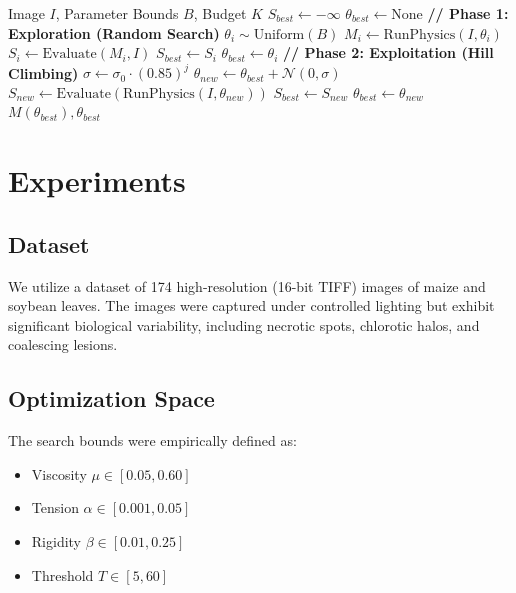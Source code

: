 \documentclass[journal]{IEEEtran}
\begin{document}
\begin{algorithm}
\caption{Stochastic Parameter Optimization}
\begin{algorithmic}[1]
\REQUIRE Image $I$, Parameter Bounds $B$, Budget $K$
\STATE $S_{best} \leftarrow -\infty$
\STATE $\theta_{best} \leftarrow \text{None}$
\STATE \textbf{// Phase 1: Exploration (Random Search)}
    \STATE $\theta_i \sim \text{Uniform}(B)$
    \STATE $M_i \leftarrow \text{RunPhysics}(I, \theta_i)$
    \STATE $S_i \leftarrow \text{Evaluate}(M_i, I)$
        \STATE $S_{best} \leftarrow S_i$
        \STATE $\theta_{best} \leftarrow \theta_i$
    \ENDIF
\ENDFOR
\STATE \textbf{// Phase 2: Exploitation (Hill Climbing)}
    \STATE $\sigma \leftarrow \sigma_0 \cdot (0.85)^j$ 
    \STATE $\theta_{new} \leftarrow \theta_{best} + \mathcal{N}(0, \sigma)$
    \STATE $S_{new} \leftarrow \text{Evaluate}(\text{RunPhysics}(I, \theta_{new}))$
        \STATE $S_{best} \leftarrow S_{new}$
        \STATE $\theta_{best} \leftarrow \theta_{new}$
    \ENDIF
\ENDFOR
\RETURN $M(\theta_{best}), \theta_{best}$
\end{algorithmic}
\end{algorithm}

\section{Experiments}
\subsection{Dataset}
We utilize a dataset of 174 high-resolution (16-bit TIFF) images of maize and soybean leaves. The images were captured under controlled lighting but exhibit significant biological variability, including necrotic spots, chlorotic halos, and coalescing lesions.

\subsection{Optimization Space}
The search bounds were empirically defined as:
\begin{itemize}
    \item Viscosity $\mu \in [0.05, 0.60]$
    \item Tension $\alpha \in [0.001, 0.05]$
    \item Rigidity $\beta \in [0.01, 0.25]$
    \item Threshold $T \in [5, 60]$
\end{itemize}
\end{document}
